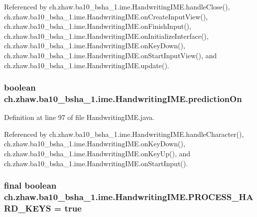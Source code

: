 Referenced by ch.zhaw.ba10\_\-bsha\_\-1.ime.HandwritingIME.handleClose(), ch.zhaw.ba10\_\-bsha\_\-1.ime.HandwritingIME.onCreateInputView(), ch.zhaw.ba10\_\-bsha\_\-1.ime.HandwritingIME.onFinishInput(), ch.zhaw.ba10\_\-bsha\_\-1.ime.HandwritingIME.onInitializeInterface(), ch.zhaw.ba10\_\-bsha\_\-1.ime.HandwritingIME.onKeyDown(), ch.zhaw.ba10\_\-bsha\_\-1.ime.HandwritingIME.onStartInputView(), and ch.zhaw.ba10\_\-bsha\_\-1.ime.HandwritingIME.update().\hypertarget{classch_1_1zhaw_1_1ba10__bsha__1_1_1ime_1_1HandwritingIME_a84134f9987fa827825135caaac882b26}{
\subsubsection[{predictionOn}]{\setlength{\rightskip}{0pt plus 5cm}boolean {\bf ch.zhaw.ba10\_\-bsha\_\-1.ime.HandwritingIME.predictionOn}}}
\label{classch_1_1zhaw_1_1ba10__bsha__1_1_1ime_1_1HandwritingIME_a84134f9987fa827825135caaac882b26}


Definition at line 97 of file HandwritingIME.java.

Referenced by ch.zhaw.ba10\_\-bsha\_\-1.ime.HandwritingIME.handleCharacter(), ch.zhaw.ba10\_\-bsha\_\-1.ime.HandwritingIME.onKeyDown(), ch.zhaw.ba10\_\-bsha\_\-1.ime.HandwritingIME.onKeyUp(), and ch.zhaw.ba10\_\-bsha\_\-1.ime.HandwritingIME.onStartInput().\hypertarget{classch_1_1zhaw_1_1ba10__bsha__1_1_1ime_1_1HandwritingIME_a6807180ab4641e86ea2c94e01ead09a8}{
\subsubsection[{PROCESS\_\-HARD\_\-KEYS}]{\setlength{\rightskip}{0pt plus 5cm}final boolean {\bf ch.zhaw.ba10\_\-bsha\_\-1.ime.HandwritingIME.PROCESS\_\-HARD\_\-KEYS} = true}}
\label{classch_1_1zhaw_1_1ba10__bsha__1_1_1ime_1_1HandwritingIME_a6807180ab4641e86ea2c94e01ead09a8}



